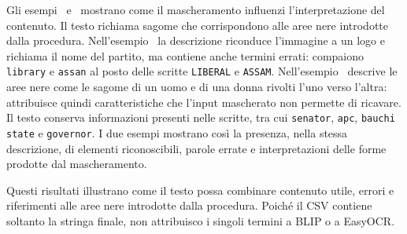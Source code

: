 Gli esempi~ e~ mostrano come il mascheramento influenzi l'interpretazione del contenuto. Il testo richiama sagome che corrispondono alle aree nere introdotte dalla procedura. Nell'esempio~ la descrizione riconduce l'immagine a un logo e richiama il nome del partito, ma contiene anche termini errati: compaiono \texttt{library} e \texttt{assan} al posto delle scritte \texttt{LIBERAL} e \texttt{ASSAM}. Nell'esempio~ descrive le aree nere come le sagome di un uomo e di una donna rivolti l'uno verso l'altra: attribuisce quindi caratteristiche che l'input mascherato non permette di ricavare. Il testo conserva informazioni presenti nelle scritte, tra cui \texttt{senator}, \texttt{apc}, \texttt{bauchi state} e \texttt{governor}. I due esempi mostrano così la presenza, nella stessa descrizione, di elementi riconoscibili, parole errate e interpretazioni delle forme prodotte dal mascheramento.

Questi risultati illustrano come il testo possa combinare contenuto utile, errori e riferimenti alle aree nere introdotte dalla procedura. Poiché il CSV contiene soltanto la stringa finale, non attribuisco i singoli termini a BLIP o a EasyOCR.

